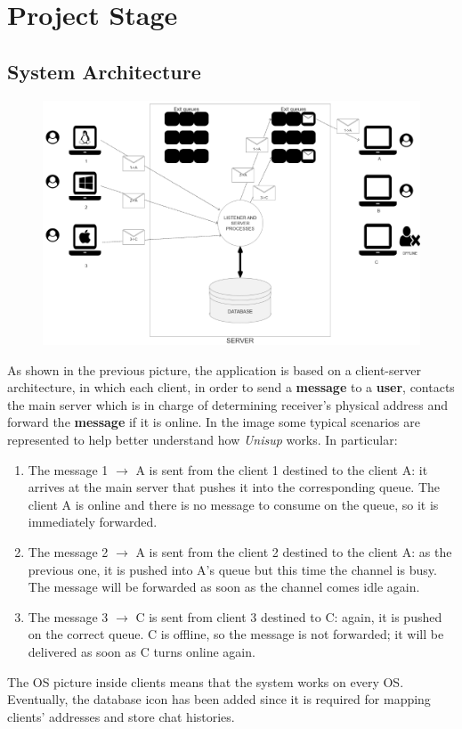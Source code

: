 \section{Project Stage}
\subsection{System Architecture}

\begin{figure}[H]
	\centering
	\includegraphics[width=\textwidth]{img/systemArchitecture.png}  
\end{figure}

As shown in the previous picture, the application is based on a client-server architecture, in which each client, in order to send a \textbf{message} to a \textbf{user}, contacts the main server which is in charge of determining receiver’s physical address and forward the \textbf{message} if it is online.
In the image some typical scenarios are represented to help better understand how \textit{Unisup} works. In particular:
\begin{enumerate}
	\item The message 1 $\xrightarrow{}$ A is sent from the client 1 destined to the client A:  it arrives at the main server that pushes it into the corresponding queue. The client A is online and there is no message to consume on the queue, so it is immediately forwarded.
	\item The message 2 $\xrightarrow{}$ A is sent from the client 2 destined to the client A:  as the previous one, it is pushed into A’s queue but this time the channel is busy. The message will be forwarded as soon as the channel comes idle again.
	\item The message 3 $\xrightarrow{}$ C is sent from client 3 destined to C: again, it is pushed on the correct queue. C is offline, so the message is not forwarded; it will be delivered as soon as C turns online again.
\end{enumerate}	
The OS picture inside clients means that the system works on every OS.
Eventually, the database icon has been added since it is required for mapping clients’ addresses and store chat histories. 



